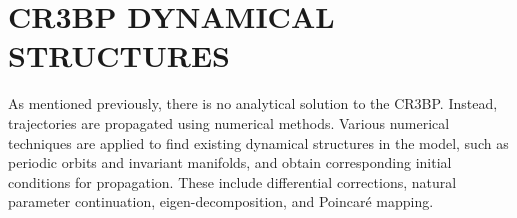 \chapter{CR3BP DYNAMICAL STRUCTURES}

As mentioned previously, there is no analytical solution to the CR3BP. Instead,
trajectories are propagated using numerical methods. Various numerical techniques are applied to
find existing dynamical structures in the model, such as periodic orbits and invariant manifolds,
and obtain corresponding initial conditions for propagation. These include differential
corrections, natural parameter continuation, eigen-decomposition, and Poincar\'e mapping.





